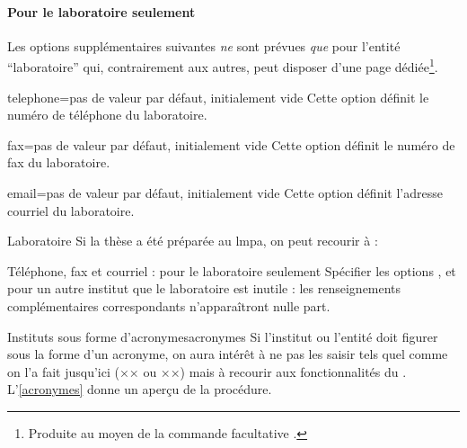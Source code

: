 \paragraph{Pour le laboratoire seulement}

Les options supplémentaires suivantes \emph{ne} sont prévues
\emph{que} pour l'entité \enquote{laboratoire} qui, contrairement
aux autres, peut disposer d'une page dédiée\footnote{Produite au
  moyen de la commande facultative .}.
%
\begin{docKey}{telephone}{=}{pas de valeur par défaut,
    initialement vide}
  Cette option définit le numéro de téléphone du laboratoire.
\end{docKey}
%
\begin{docKey}{fax}{=}{pas de valeur par défaut,
    initialement vide}
  Cette option définit le numéro de fax du laboratoire.
\end{docKey}
\begin{docKey}{email}{=}{pas de valeur par
    défaut, initialement vide}
  Cette option définit l'adresse courriel du laboratoire.
\end{docKey}
%
\begin{dbexample}{Laboratoire}{}
  Si la thèse a été préparée au \gls{lmpa}, on peut recourir à :
  \NoAutoSpacing%
\begin{bodycode}
\end{bodycode}
\end{dbexample}
%
\begin{dbremark}{Téléphone, fax et courriel : pour le
    laboratoire seulement}{}
  Spécifier les options ,  et  pour
  un autre institut que le laboratoire est inutile : les renseignements
  complémentaires correspondants n'apparaîtront nulle part.
\end{dbremark}
%
\begin{dbremark}{Instituts sous forme d'acronymes}{acronymes}
  Si l'institut ou l'entité doit figurer sous la forme d'un acronyme, on aura
  intérêt à ne pas les saisir tels quel comme on l'a fait jusqu'ici
  (×× ou ××) mais à recourir aux
  fonctionnalités du . L'\vref{acronymes} donne un aperçu
  de la procédure.
\end{dbremark}

